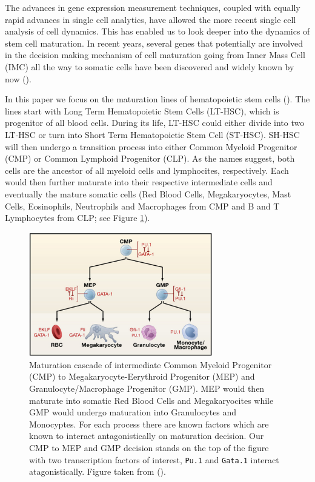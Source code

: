 \documentclass{bioinfo}
\begin{document}
The advances in gene expression measurement techniques, coupled with equally rapid advances in single cell analytics, have allowed the more recent single cell analysis of cell dynamics. This has enabled us to look deeper into the dynamics of stem cell maturation. In recent years, several genes that potentially are involved in the decision making mechanism of cell maturation going from Inner Mass Cell (IMC) all the way to somatic cells have been discovered and widely known by now (\citealp{Graf09}).

In this paper we focus on the maturation lines of hematopoietic stem cells (\citealp{Orkin08}). The lines start with Long Term Hematopoietic Stem Cells (LT-HSC), which is progenitor of all blood cells. During its life, LT-HSC could either divide into two LT-HSC or turn into Short Term Hematopoietic Stem Cell (ST-HSC). SH-HSC will then undergo a transition process into either Common Myeloid Progenitor (CMP) or Common Lymphoid Progenitor (CLP). As the names suggest, both cells are the ancestor of all myeloid cells and lymphocites, respectively. Each would then further maturate into their respective intermediate cells and eventually the mature somatic cells (Red Blood Cells, Megakaryocytes, Mast Cells, Eosinophils, Neutrophils and Macrophages from CMP and B and T Lymphocytes from CLP; see Figure \ref{fig:01}).

\begin{figure}[h]
\includegraphics[width=8cm]{figures/homatopoietic_focus}
\caption{Maturation cascade of intermediate Common Myeloid Progenitor (CMP) to Megakaryocyte-Eerythroid Progenitor (MEP) and Granulocyte/Macrophage Progenitor (GMP). MEP would then maturate into somatic Red Blood Cells and Megakaryocites while GMP would undergo maturation into Granulocytes and Monocyptes. For each process there are known factors which are known to interact antagonistically on maturation decision. Our CMP to MEP and GMP decision stands on the top of the figure with two transcription factors of interest, \texttt{Pu.1} and \texttt{Gata.1} interact atagonistically. Figure taken from (\citealp{Graf09}).}\label{fig:01}
\end{figure}
\end{document}
